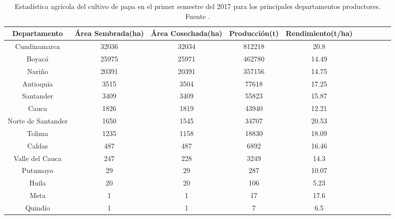 \begin{table}[H] %
\begin{center}
	\caption{Estadística agrícola del cultivo de papa en el primer semestre del 2017 para los principales departamentos productores. Fuente \citep{madr2017}.}
    \label{table:1}
	\begin{tabular}{cccccccccc}
Departamento&Área Sembrada(ha)&Área Cosechada(ha)&Producción(t)&Rendimiento(t/ha)&\\
\hline
Cundinamarca&32036&32034&812218&20.8&\\
Boyacá&25975&25971&462780&14.49&\\
Nariño&20391&20391&357156&14.75&\\
Antioquia&3515&3504&77618&17.25&\\
Santander&3409&3409&55823&15.87&\\
Cauca&1826&1819&43940&12.21&\\
Norte de Santander&1650&1545&34707&20.53&\\
Tolima&1235&1158&18830&18.09&\\
Caldas&487&487&6892&16.46&\\
Valle del Cauca&247&228&3249&14.3&\\
Putumayo&29&29&287&10.07&\\
Huila&20&20&106&5.23&\\
Meta&1&1&17&17.6&\\
Quindío&1&1&7&6.5&\\
		\end{tabular}
		
\end{center}

\end{table}

